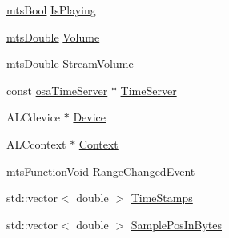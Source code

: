 \begin{DoxyCompactItemize}
\item 
\hyperlink{mts_generic_object_proxy_8h_ae2e26261f1874d4aa4ee374ece7646bd}{mts\-Bool} \hyperlink{classosa_open_a_l_a83e535cc470a05a2031c35f4a549ec74}{Is\-Playing}
\item 
\hyperlink{mts_generic_object_proxy_8h_a31e76b0190a8d3f9838626cd7b47bd75}{mts\-Double} \hyperlink{classosa_open_a_l_a37e986d3fd52a05679b555fff97910c7}{Volume}
\item 
\hyperlink{mts_generic_object_proxy_8h_a31e76b0190a8d3f9838626cd7b47bd75}{mts\-Double} \hyperlink{classosa_open_a_l_aac985710448fc31ea8b31240a1f5a2e1}{Stream\-Volume}
\item 
const \hyperlink{classosa_time_server}{osa\-Time\-Server} $\ast$ \hyperlink{classosa_open_a_l_a7b9cfbdfb0f92f71c39a223392a34f11}{Time\-Server}
\item 
A\-L\-Cdevice $\ast$ \hyperlink{classosa_open_a_l_ac256dbad70ce7706711a7138cb883ef1}{Device}
\item 
A\-L\-Ccontext $\ast$ \hyperlink{classosa_open_a_l_a55912d0e1beccbc92573ca8a554158f7}{Context}
\item 
\hyperlink{classmts_function_void}{mts\-Function\-Void} \hyperlink{classosa_open_a_l_a77e891d189f6d4a1ef963e7920a95cbd}{Range\-Changed\-Event}
\item 
std\-::vector$<$ double $>$ \hyperlink{classosa_open_a_l_aa8fcaf462af83212a65784a5d46ff592}{Time\-Stamps}
\item 
std\-::vector$<$ double $>$ \hyperlink{classosa_open_a_l_a91923ec0ba88fb79b905e16436e6b788}{Sample\-Pos\-In\-Bytes}
\end{DoxyCompactItemize}


